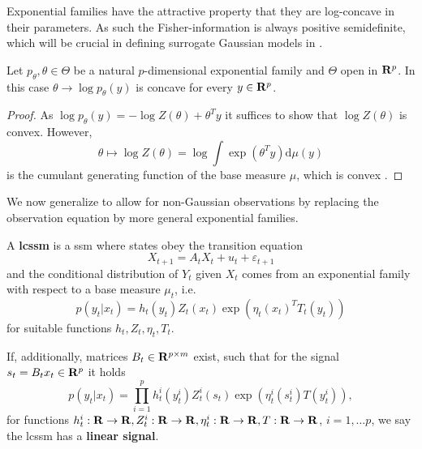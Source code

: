 Exponential families have the attractive property that they are log-concave in their parameters. As such the Fisher-information is always positive semidefinite, which will be crucial in defining surrogate Gaussian models in .
\begin{lemma}
    Let $p_{\theta}, \theta \in \Theta$ be a natural $p$-dimensional exponential family and $\Theta$ open in $\mathbf R^{p}$. In this case $\theta \to \log p_{\theta}(y)$ is concave for every $y \in \mathbf R^{p}$.
\end{lemma}

\begin{proof}
    As $\log p_{\theta}(y) = - \log Z(\theta) + \theta^{T} y$ it suffices to show that $\log Z(\theta)$ is convex. However, 
    $$\theta \mapsto \log Z(\theta) = \log \int \exp \left( \theta^{T}y \right) \mathrm d \mu(y)$$ is the cumulant generating function of the base measure $\mu$, which is convex \cite[p. 148]{Billingsley1995Probabilitya}.
\end{proof}

We now generalize  to allow for non-Gaussian observations by replacing the observation equation  by more general exponential families.

\begin{definition}
    \label{def:lcssm}
    A \textbf{\acrfull{lcssm}} is a \gls{ssm} where states obey the transition equation 
    $$
    X_{t + 1} = A_{t}X_{t} + u_{t} + \varepsilon_{t + 1}
    $$
    and the conditional distribution of $Y_{t}$ given $X_{t}$ comes from an exponential family with respect to a base measure $\mu_{t}$, i.e.
    $$
    p (y_{t}|x_{t}) = h_{t}(y_{t}) Z_{t}(x_{t}) \exp \left( \eta_{t}(x_{t})^{T} T_{t}(y_{t}) \right)
    $$
    for suitable functions $h_{t}, Z_{t}, \eta_{t}, T_{t}$. 

    If, additionally, matrices $B_{t} \in \mathbf R^{p \times m}$ exist, such that for the signal $s_{t} = B_{t}x_{t} \in \mathbf R^{p}$ it holds
    $$
    p(y_{t}|x_{t}) = \prod_{i = 1}^p h^{i}_{t}(y^{i}_{t}) Z^{i}_{t} (s_{t}) \exp \left( \eta^{i}_{t} (s^{i}_{t}) T(y^{i}_{t}) \right),
    $$
    for functions $h_{t}^{i}: \mathbf R \to \mathbf R, Z^{i}_{t}: \mathbf R \to \mathbf R, \eta^{i}_{t}: \mathbf R\to\mathbf R, T: \mathbf R\to\mathbf R$, $i = 1, \dots p$, we say the \gls{lcssm} has a \textbf{linear signal}.

\end{definition}

